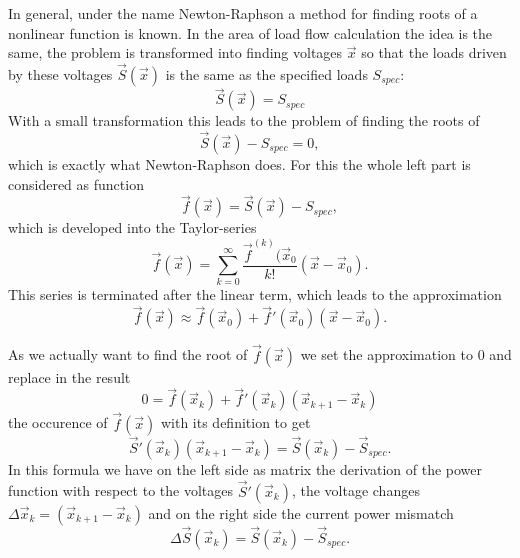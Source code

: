 In general, under the name Newton-Raphson a method for finding roots of a nonlinear function is known. In the area of load flow calculation the idea is the same, the problem is transformed into finding voltages $\vec x$ so that the loads driven by these voltages $\vec S (\vec x)$ is the same as the specified loads $S_{spec}$:
\begin{equation}
	\vec S (\vec x) = S_{spec}
\end{equation}
With a small transformation this leads to the problem of finding the roots of
\begin{equation}
	\vec S (\vec x) - S_{spec} = 0,
\end{equation}
which is exactly what Newton-Raphson does. For this the whole left part is considered as function
\begin{equation}
	\vec f (\vec x) = \vec S (\vec x) - S_{spec},
\end{equation}
which is developed into the Taylor-series
\begin{equation}
	\vec f (\vec x) = \sum_{k = 0}^\infty \frac{\vec f^{(k)} (\vec x_0}{k!} \left( \vec x - \vec x_0 \right).
\end{equation}
This series is terminated after the linear term, which leads to the approximation
\begin{equation}
	\vec f (\vec x) \approx \vec f (\vec x_0) + \vec f' (\vec x_0) \left( \vec x - \vec x_0 \right).
\end{equation}

As we actually want to find the root of $\vec f (\vec x)$ we set the approximation to 0 and replace in the result
\begin{equation}
	0 = \vec f (\vec x_k) + \vec f' (\vec x_k) \left( \vec x_{k + 1} - \vec x_k \right)
\end{equation}
the occurence of $\vec f (\vec x)$ with its definition to get
\begin{equation}
	\vec S' (\vec x_k) \left( \vec x_{k + 1} - \vec x_k \right) = \vec S (\vec x_k) - \vec S_{spec}.
	\label{eq:newton_raphson_equation_system}
\end{equation}
In this formula we have on the left side as matrix the derivation of the power function with respect to the voltages $\vec S' (\vec x_k)$, the voltage changes $\Delta \vec x_k = \left( \vec x_{k + 1} - \vec x_k \right)$ and on the right side the current power mismatch 
\begin{equation}
	\Delta \vec S (\vec x_k) = \vec S (\vec x_k) - \vec S_{spec}.
	\label{eq:power_mismatch}
\end{equation}

